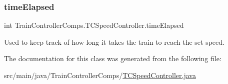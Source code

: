 \subsubsection{\texorpdfstring{time\+Elapsed}{timeElapsed}}
{\footnotesize\ttfamily int Train\+Controller\+Comps.\+T\+C\+Speed\+Controller.\+time\+Elapsed\hspace{0.3cm}{\ttfamily [private]}}



Used to keep track of how long it takes the train to reach the set speed. 



The documentation for this class was generated from the following file\+:\begin{DoxyCompactItemize}
\item 
src/main/java/\+Train\+Controller\+Comps/\hyperlink{TCSpeedController_8java}{T\+C\+Speed\+Controller.\+java}\end{DoxyCompactItemize}
